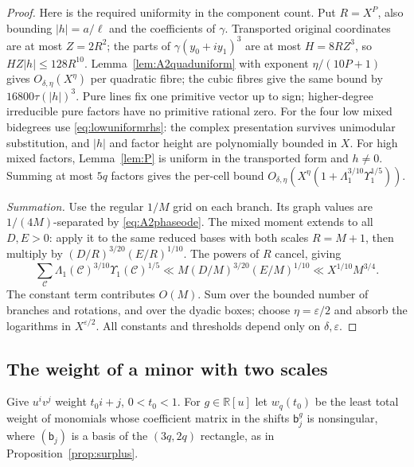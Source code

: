 \documentclass[11pt,reqno]{amsart}
\theoremstyle{definition}
\theoremstyle{remark}
\numberwithin{equation}{section}
\newcommand{\R}{\mathbb R}\newcommand{\Z}{\mathbb Z}\newcommand{\N}{\mathbb N}
\newcommand{\eps}{\varepsilon}\newcommand{\card}{\#}
\begin{document}
\begin{proof}
Here is the required uniformity in the component count. Put $R=X^P$,
also bounding $|h|=a/\ell$ and the coefficients of $\gamma$.
Transported original coordinates are at most $Z=2R^2$; the parts
of $\gamma(y_0+iy_1)^3$ are at most $H=8RZ^3$, so
$HZ|h|\le128R^{10}$. Lemma~\ref{lem:A2quaduniform} with exponent
$\eta/(10P+1)$ gives $O_{\delta,\eta}(X^\eta)$ per quadratic fibre;
the cubic fibres give the same bound by $16800\tau(|h|)^3$.
Pure lines fix one primitive vector up to sign; higher-degree
irreducible pure factors have no primitive rational zero.
For the four low mixed bidegrees use \eqref{eq:lowuniformrhs}:
the complex presentation survives unimodular substitution, and
$|h|$ and factor height are polynomially bounded in $X$.
For high mixed factors, Lemma~\ref{lem:P} is uniform in the
transported form and $h\ne0$. Summing at most $5q$ factors gives
the per-cell bound
$O_{\delta,\eta}(X^\eta(1+\Lambda_1^{3/10}\Upsilon_1^{1/5}))$.

\emph{Summation.}
Use the regular $1/M$ grid on each branch. Its graph values are
$1/(4M)$-separated by \eqref{eq:A2phaseode}.
The mixed moment extends to all $D,E>0$: apply it to the same
reduced bases with both scales $R=M+1$, then multiply by
$(D/R)^{3/20}(E/R)^{1/10}$. The powers of $R$ cancel, giving
\[
 \sum_{\mathcal C}\Lambda_1(\mathcal C)^{3/10}\Upsilon_1(\mathcal C)^{1/5}
 \ll M(D/M)^{3/20}(E/M)^{1/10}\ll X^{1/10}M^{3/4}.
\]
The constant term contributes $O(M)$. Sum over the bounded number
of branches and rotations, and over the dyadic boxes; choose
$\eta=\eps/2$ and absorb the logarithms in $X^{\eps/2}$.
All constants and thresholds depend only on $\delta,\eps$.
\end{proof}

\subsection{The weight of a minor with two scales}
Give $u^iv^j$ weight $t_0i+j$, $0<t_0<1$. For $g\in\R[u]$ let
$w_q(t_0)$ be the least total weight of monomials whose coefficient
matrix in the shifts $\mathsf b_j^g$ is nonsingular, where
$(\mathsf b_j)$ is a basis of the $(3q,2q)$ rectangle, as in
Proposition~\ref{prop:surplus}.
\end{document}

